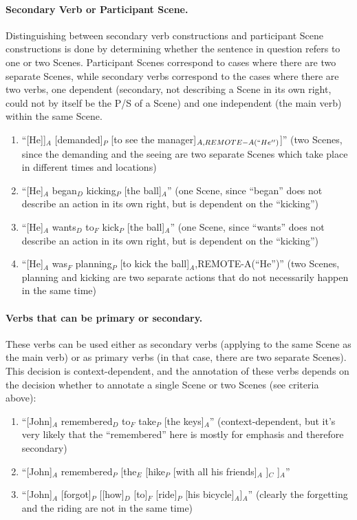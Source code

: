 \documentclass[11pt]{article}
\newcommand{\be}{\begin{enumerate}}
\newcommand{\ee}{\end{enumerate}}
\begin{document}
\paragraph{Secondary Verb or Participant Scene.} Distinguishing between secondary verb constructions and participant Scene constructions is done by determining whether the sentence in question refers to one or two Scenes. Participant Scenes correspond to cases where there are two separate Scenes, while secondary verbs correspond to the cases where there are two verbs, one dependent (secondary, not describing a Scene in its own right, could not by itself be the P/S of a Scene) and one independent (the main verb) within the same Scene.
\be
\item
``[He]]$_A$ [demanded]$_P$ [to see the manager]$_{A,REMOTE-A(``He'')}$]'' (two Scenes, since the demanding and the seeing are two separate Scenes which take place in different times and locations)
\item
``[He]$_A$ began$_D$ kicking$_P$ [the ball]$_A$'' (one Scene, since ``began'' does not describe an action in its own right, but is dependent on the ``kicking'')
\item
``[He]$_A$ wants$_D$ to$_F$ kick$_P$ [the ball]$_A$'' (one Scene, since ``wants'' does not describe an action in its own right, but is dependent on the ``kicking'')
\item
``[He]$_A$ was$_F$ planning$_P$ [to kick the ball]$_A$,REMOTE-A(``He'')'' (two Scenes,  planning and kicking are two separate actions that do not necessarily happen in the same time)
\ee

\paragraph{Verbs that can be primary or secondary.} These verbs can be used either as secondary verbs (applying to the same Scene as the main verb) or as primary verbs (in that case, there are two separate Scenes). This decision is context-dependent, and the annotation of these verbs depends on the decision whether to annotate a single Scene or two Scenes (see criteria above):
\be
\item
``[John]$_A$ remembered$_D$ to$_F$ take$_P$ [the keys]$_A$'' (context-dependent, but it's very likely that the ``remembered'' here is mostly for emphasis and therefore secondary)
\item
``[John]$_A$ remembered$_P$ [the$_E$ [hike$_P$ [with all his friends]$_A$ ]$_C$ ]$_A$''
\item
``[John]$_A$ [forgot]$_P$ [[how]$_D$ [to]$_F$ [ride]$_P$ [his bicycle]$_A$]$_A$'' (clearly the forgetting and the riding are not in the same time)
\ee
\end{document}
